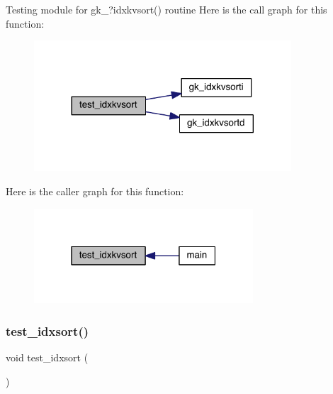 Testing module for gk\+\_\+?idxkvsort() routine Here is the call graph for this function\+:\nopagebreak
\begin{figure}[H]
\begin{center}
\leavevmode
\includegraphics[width=272pt]{a00152_ab63d10c508d01adca7672ac341b950ba_cgraph}
\end{center}
\end{figure}
Here is the caller graph for this function\+:\nopagebreak
\begin{figure}[H]
\begin{center}
\leavevmode
\includegraphics[width=232pt]{a00152_ab63d10c508d01adca7672ac341b950ba_icgraph}
\end{center}
\end{figure}
\mbox{\label{a00152_a3a4da1d3370fc7c176261dfc8eef5691}} 
\subsubsection{\texorpdfstring{test\+\_\+idxsort()}{test\_idxsort()}}
{\footnotesize\ttfamily void test\+\_\+idxsort (\begin{DoxyParamCaption}{ }\end{DoxyParamCaption})}

